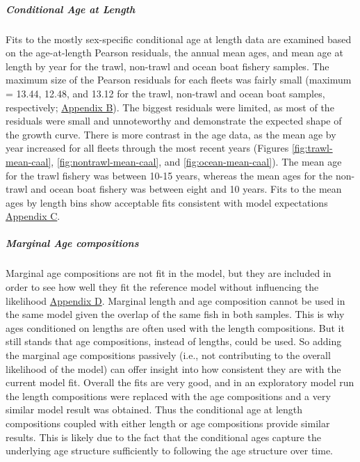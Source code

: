 \documentclass[11pt,
  english,
  letterpaper,
]{article}
\begin{document}
\hypertarget{conditional-age-at-length}{%
\subparagraph{Conditional Age at Length}\label{conditional-age-at-length}}

Fits to the mostly sex-specific conditional age at length data are examined based on the age-at-length Pearson residuals, the annual mean ages, and mean age at length by year for the trawl, non-trawl and ocean boat fishery samples. The maximum size of the Pearson residuals for each fleets was fairly small (maximum = 13.44, 12.48, and 13.12 for the trawl, non-trawl and ocean boat samples, respectively; \protect\hyperlink{app_b}{Appendix B}). The biggest residuals were limited, as most of the residuals were small and unnoteworthy and demonstrate the expected shape of the growth curve. There is more contrast in the age data, as the mean age by year increased for all fleets through the most recent years (Figures \ref{fig:trawl-mean-caal}, \ref{fig:nontrawl-mean-caal}, and \ref{fig:ocean-mean-caal}). The mean age for the trawl fishery was between 10-15 years, whereas the mean ages for the non-trawl and ocean boat fishery was between eight and 10 years. Fits to the mean ages by length bins show acceptable fits consistent with model expectations \protect\hyperlink{app_c}{Appendix C}.

\hypertarget{marginal-age-compositions}{%
\subparagraph{Marginal Age compositions}\label{marginal-age-compositions}}

Marginal age compositions are not fit in the model, but they are included in order to see how well they fit the reference model without influencing the likelihood \protect\hyperlink{app_d}{Appendix D}. Marginal length and age composition cannot be used in the same model given the overlap of the same fish in both samples. This is why ages conditioned on lengths are often used with the length compositions. But it still stands that age compositions, instead of lengths, could be used. So adding the marginal age compositions passively (i.e., not contributing to the overall likelihood of the model) can offer insight into how consistent they are with the current model fit. Overall the fits are very good, and in an exploratory model run the length compositions were replaced with the age compositions and a very similar model result was obtained. Thus the conditional age at length compositions coupled with either length or age compositions provide similar results. This is likely due to the fact that the conditional ages capture the underlying age structure sufficiently to following the age structure over time.
\end{document}
